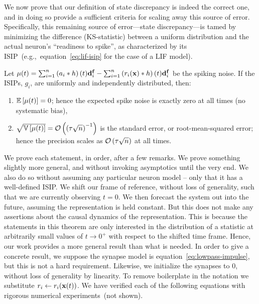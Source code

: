 We now prove that our definition of state discrepancy is indeed the correct one, and in doing so provide a sufficient criteria for scaling away this source of error.
Specifically, this remaining source of error---state discrepancy---is tamed by minimizing the difference (KS-statistic) between a uniform distribution and the actual neuron's ``readiness to spike'', as characterized by its ISIP~(e.g.,~equation~\ref{eq:lif-isip} for the case of a LIF model).

\vspace{1em}

\begin{theorem}
\label{thm:correctness}
Let $\mathbf{\mu}(t) = \sum_{i=1}^n \left(a_i \ast h \right)(t) \mathbf{d}^{\mathbf{f}}_i- \sum_{i=1}^n \left( r_i(\mathbf{x}) \ast h \right)(t) \mathbf{d}^{\mathbf{f}}_i$
be the spiking noise.
If the ISIPs, $g_i$, are uniformly and independently distributed, then:
\begin{enumerate}
\item $\mathbb{E}\left[{ \mathbf{\mu}(t) }\right] = 0$; hence the expected spike noise is exactly zero at all times (no systematic bias), 
\item $\sqrt{\mathbb{V}\left[{\mathbf{\mu}(t)}\right]} = \mathcal{O}\left({\left(\tau \sqrt{n}\right)^{-1}}\right)$ is the standard error, or root-mean-squared error; hence the precision scales as $\mathcal{O}\left({ \tau \sqrt{n} }\right)$ at all times.
\end{enumerate}
\end{theorem}
We prove each statement, in order, after a few remarks.
We prove something slightly more general, and without invoking asymptotics until the very end.
We also do so without assuming any particular neuron model -- only that it has a well-defined ISIP.
We shift our frame of reference, without loss of generality, such that we are currently observing $t = 0$.
We then forecast the system out into the future, assuming the representation is held constant.
But this does not make any assertions about the causal dynamics of the representation.
This is because the statements in this theorem are only interested in the distribution of a statistic at arbitrarily small values of $t \rightarrow 0^+$ with respect to the shifted time frame.
Hence, our work provides a more general result than what is needed.
In order to give a concrete result, we suppose the synapse model is equation~\ref{eq:lowpass-impulse}, but this is not a hard requirement.
Likewise, we initialize the synapses to $0$, without loss of generality by linearity.
To remove boilerplate in the notation we substitute $r_i \leftarrow r_i(\mathbf{x}(t))$.
We have verified each of the following equations with rigorous numerical experiments~(not shown).

